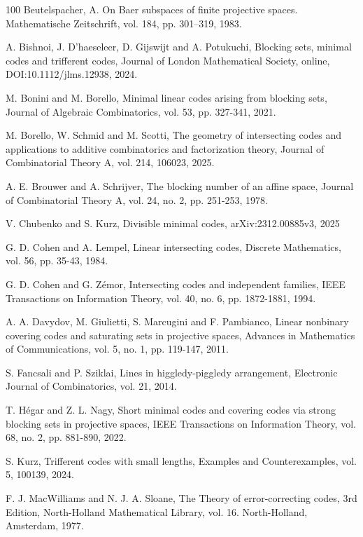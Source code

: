\documentclass[12pt]{article}
\begin{document}
\begin{thebibliography}{100}
 Beutelspacher, A. On Baer subspaces of finite projective spaces. Mathematische Zeitschrift, vol. 184, pp. 301–319, 1983.


 A. Bishnoi, J. D'haeseleer, D. Gijswijt and A. Potukuchi, Blocking sets, minimal codes and trifferent codes, Journal of London Mathematical Society, online, DOI:10.1112/jlms.12938, 2024.


    M. Bonini and M. Borello, Minimal linear codes arising from
blocking sets, Journal of Algebraic Combinatorics, vol. 53, pp. 327-341, 2021.

 M. Borello, W. Schmid and M. Scotti, The geometry of intersecting codes and applications to additive combinatorics and factorization theory, Journal of Combinatorial Theory A, vol. 214, 106023, 2025.


 A. E. Brouwer and A. Schrijver, The blocking number of an affine space, Journal of
Combinatorial Theory A, vol. 24, no. 2, pp. 251-253, 1978.

 V. Chubenko and S. Kurz, Divisible minimal codes, arXiv:2312.00885v3, 2025

 G. D. Cohen and A. Lempel, Linear intersecting codes, Discrete Mathematics, vol. 56, pp. 35-43, 1984.


 G. D. Cohen and G. Z\'{e}mor, Intersecting codes and independent families, IEEE Transactions on Information Theory, vol. 40, no. 6, pp. 1872-1881, 1994.


 A. A. Davydov, M. Giulietti, S. Marcugini and F. Pambianco, Linear nonbinary covering
codes and saturating sets in projective spaces, Advances in Mathematics of Communications, vol. 5, no. 1, pp. 119-147, 2011.


 S. Fancsali and P. Sziklai, Lines in higgledy-piggledy arrangement, Electronic Journal of
Combinatorics, vol. 21, 2014.



 T. H\'{e}gar and Z. L. Nagy, Short minimal codes and covering codes via strong blocking sets in projective spaces, IEEE Transactions on Information Theory, vol. 68, no. 2, pp. 881-890, 2022.



 S. Kurz, Trifferent codes with small lengths, Examples and Counterexamples, vol. 5, 100139, 2024.

 F. J.  MacWilliams and N. J. A. Sloane, The Theory of error-correcting codes, 3rd Edition, North-Holland Mathematical Library, vol. 16. North-Holland, Amsterdam, 1977.


\end{thebibliography}
\end{document}
